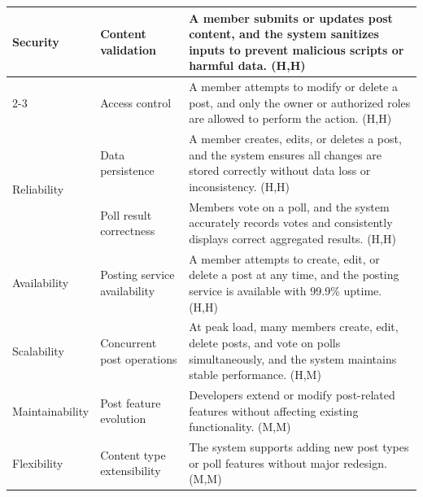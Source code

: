 \documentclass{article}
\begin{document}
\begin{table}[H]
\begin{tabular}{|p{3cm}|p{4cm}|p{7cm}|}
        \multirow{2}{*}{Security}
                                   & Content validation
                                   & A member submits or updates post content, and the system sanitizes inputs to prevent malicious scripts or harmful data. (H,H)                                       \\
        \cline{2-3}
                                   & Access control
                                   & A member attempts to modify or delete a post, and only the owner or authorized roles are allowed to perform the action. (H,H)                                       \\
        \hline

        \multirow{2}{*}{Reliability}
                                   & Data persistence
                                   & A member creates, edits, or deletes a post, and the system ensures all changes are stored correctly without data loss or inconsistency. (H,H)                       \\
        \cline{2-3}
                                   & Poll result correctness
                                   & Members vote on a poll, and the system accurately records votes and consistently displays correct aggregated results. (H,H)                                         \\
        \hline

        Availability
                                   & Posting service availability
                                   & A member attempts to create, edit, or delete a post at any time, and the posting service is available with 99.9\% uptime. (H,H)                                     \\
        \hline

        Scalability
                                   & Concurrent post operations
                                   & At peak load, many members create, edit, delete posts, and vote on polls simultaneously, and the system maintains stable performance. (H,M)                         \\
        \hline

        Maintainability
                                   & Post feature evolution
                                   & Developers extend or modify post-related features without affecting existing functionality. (M,M)                                                                   \\
        \hline

        Flexibility
                                   & Content type extensibility
                                   & The system supports adding new post types or poll features without major redesign. (M,M)                                                                            \\
        \hline


\end{tabular}
\end{table}
\end{document}
